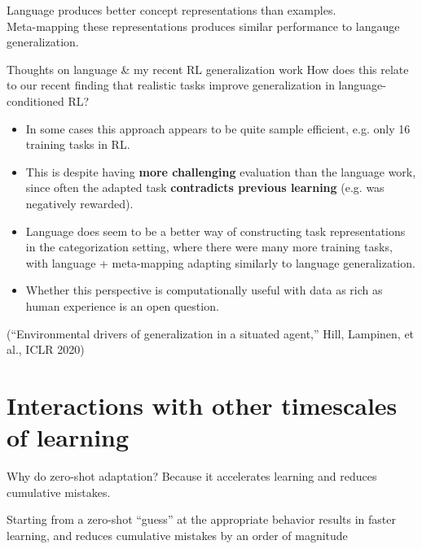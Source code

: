 \documentclass{beamer}
\begin{document}
\begin{frame}[standout]
Language produces better concept representations than examples.\\[1em]
Meta-mapping these representations produces similar performance to langauge generalization.
\end{frame}

\begin{frame}{Thoughts on language \& my recent RL generalization work}
How does this relate to our recent finding that realistic tasks improve generalization in language-conditioned RL?\par
\begin{itemize}[<+(1)->]
\item In some cases this approach appears to be quite sample efficient, e.g. only 16 training tasks in RL.
\item This is despite having \textbf{more challenging} evaluation than the language work, since often the adapted task \textbf{contradicts previous learning} (e.g. was negatively rewarded). 
\item Language does seem to be a better way of constructing task representations in the categorization setting, where there were many more training tasks, with language + meta-mapping adapting similarly to language generalization. 
\item Whether this perspective is computationally useful with data as rich as human experience is an open question.
\end{itemize}
(``Environmental drivers of generalization in a situated agent,'' Hill, Lampinen, et al., ICLR 2020)
\end{frame}

\section{Interactions with other timescales of learning}

\begin{frame}{Why do zero-shot adaptation?}
Because it accelerates learning and reduces cumulative mistakes.
{
\centering
{}
}
\end{frame}

\begin{frame}[standout]
Starting from a zero-shot ``guess'' at the appropriate behavior results in faster learning, and reduces cumulative mistakes by an order of magnitude 
\end{frame}
\end{document}
